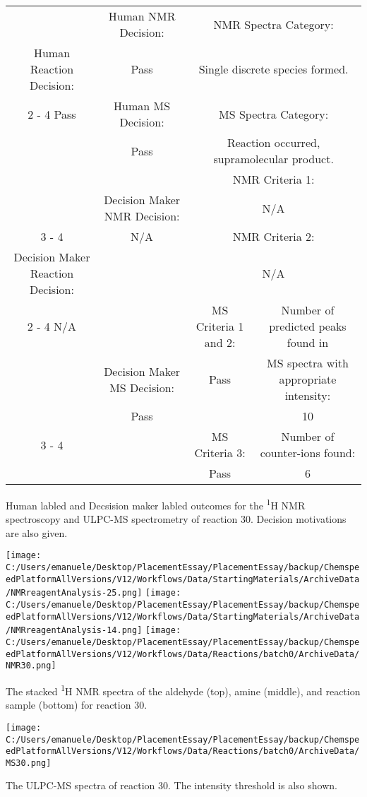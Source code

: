 \documentclass{article}%
\begin{document}
\begin{Decision Table}[H]%
\begin{tabular}{|c|c|c|c|}%
\hline%
&Human NMR Decision:&\multicolumn{2}{|c|}{NMR Spectra Category:}\\%
Human Reaction Decision:&Pass&\multicolumn{2}{|c|}{Single discrete species formed.}\\%
\cline{2%
-%
4}%
Pass&Human MS Decision:&\multicolumn{2}{|c|}{MS Spectra Category:}\\%
&Pass&\multicolumn{2}{|c|}{Reaction occurred, supramolecular product.}\\%
\hline%
&&\multicolumn{2}{|c|}{NMR Criteria 1:}\\%
&Decision Maker NMR Decision:&\multicolumn{2}{|c|}{N/A}\\%
\cline{3%
-%
4}%
&N/A&\multicolumn{2}{|c|}{NMR Criteria 2:}\\%
Decision Maker Reaction Decision:&&\multicolumn{2}{|c|}{N/A}\\%
\cline{2%
-%
4}%
N/A&&MS Criteria 1 and 2:&Number of predicted peaks found in\\%
&Decision Maker MS Decision:&Pass&MS spectra with appropriate intensity:\\%
&Pass&&10\\%
\cline{3%
-%
4}%
&&MS Criteria 3:&Number of counter{-}ions found:\\%
&&Pass&6\\%
\hline%
\end{tabular}%
\caption{Human labled and Decsision maker labled outcomes for the \textsuperscript{1}H NMR spectroscopy and ULPC-MS spectrometry of reaction 30. Decision motivations are also given.}%
\end{Decision Table}%
\begin{NMR Spectra}[H]%
\begin{center}%
\texttt{[image: C:/Users/emanuele/Desktop/PlacementEssay/PlacementEssay/backup/ChemspeedPlatformAllVersions/V12/Workflows/Data/StartingMaterials/ArchiveData/NMRreagentAnalysis-25.png]}\hfill%
\texttt{[image: C:/Users/emanuele/Desktop/PlacementEssay/PlacementEssay/backup/ChemspeedPlatformAllVersions/V12/Workflows/Data/StartingMaterials/ArchiveData/NMRreagentAnalysis-14.png]}\hfill%
\texttt{[image: C:/Users/emanuele/Desktop/PlacementEssay/PlacementEssay/backup/ChemspeedPlatformAllVersions/V12/Workflows/Data/Reactions/batch0/ArchiveData/NMR30.png]}\hfill%
\end{center}%
\caption{The stacked \textsuperscript{1}H NMR spectra of the aldehyde (top), amine (middle), and reaction sample (bottom) for reaction 30.}%
\end{NMR Spectra}%
\begin{MS Spectra}[H]%
\begin{center}%
\texttt{[image: C:/Users/emanuele/Desktop/PlacementEssay/PlacementEssay/backup/ChemspeedPlatformAllVersions/V12/Workflows/Data/Reactions/batch0/ArchiveData/MS30.png]}\hfill%
\end{center}%
\caption{The ULPC-MS spectra of reaction 30. The intensity threshold is also shown.}%
\end{MS Spectra}%
\end{document}
